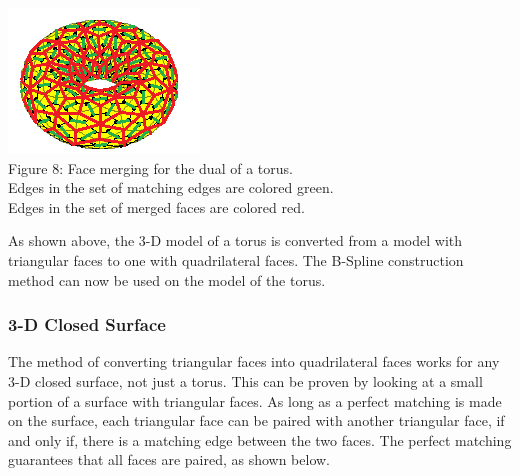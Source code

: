 \documentclass[12pt]{article}
\begin{document}
\begin{flushleft}
\begin{center}
\includegraphics[scale=1.7]{images/torusmerging.png}\\
Figure 8: Face merging for the dual of a torus.\\
Edges in the set of matching edges are colored green.\\
Edges in the set of merged faces are colored red.
\end{center}

As shown above, the 3-D model of a torus is converted from a model with triangular faces to one with quadrilateral faces. The B-Spline construction method can now be used on the model of the torus.

\subsubsection*{3-D Closed Surface}
The method of converting triangular faces into quadrilateral faces works for any 3-D closed surface, not just a torus. This can be proven by looking at a small portion of a surface with triangular faces. As long as a perfect matching is made on the surface, each triangular face can be paired with another triangular face, if and only if, there is a matching edge between the two faces. The perfect matching guarantees that all faces are paired, as shown below.


\end{flushleft}
\end{document}
